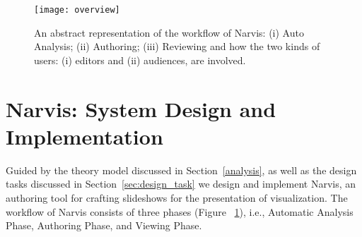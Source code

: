 
\begin{figure}
 \centering %
 \texttt{[image: overview]}
 \caption{An abstract representation of the workflow of Narvis: (i) Auto Analysis; (ii) Authoring; (iii) Reviewing and how the two kinds of users: (i) editors and (ii) audiences, are involved. }
 \label{fig:overview}
\end{figure}


\section{Narvis: System Design and Implementation}


Guided by the theory model discussed in Section~\ref{analysis}, as well as the design tasks discussed in Section~\ref{sec:design_task} we design and implement Narvis, an authoring tool for crafting slideshows for the presentation of visualization. The workflow of Narvis consists of three phases (Figure ~\ref{fig:overview}), i.e., Automatic Analysis Phase, Authoring Phase, and Viewing Phase.




